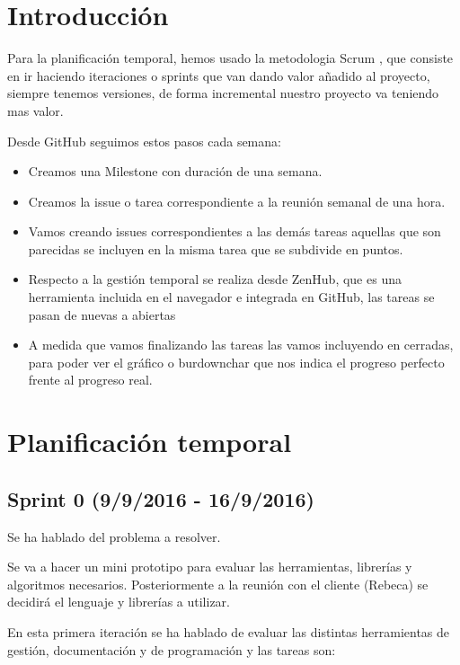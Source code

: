 
\section{Introducción}
Para la planificación temporal, hemos usado la metodologia Scrum \cite{Scrum}, que consiste en ir haciendo iteraciones o sprints que van dando valor añadido al proyecto, siempre tenemos versiones, de forma incremental nuestro proyecto va teniendo mas valor.

Desde GitHub seguimos estos pasos cada semana:
\begin{itemize}
\item Creamos una Milestone con duración de una semana.
\item Creamos la issue o tarea correspondiente a la reunión semanal de una hora.
\item Vamos creando issues correspondientes a las demás tareas aquellas que son parecidas se incluyen en la misma tarea que se subdivide en puntos.
\item Respecto a la gestión temporal se realiza desde ZenHub, que es una herramienta incluida en el navegador e integrada en GitHub, las tareas se pasan de nuevas a abiertas
\item A medida que vamos finalizando las tareas las vamos incluyendo en cerradas, para poder ver el gráfico o burdownchar que nos indica el progreso perfecto frente al progreso real.

\end{itemize}


\section{Planificación temporal}

\subsection{Sprint 0 (9/9/2016 - 16/9/2016)}
Se ha hablado del problema a resolver.

Se va a hacer un mini prototipo para evaluar las herramientas, librerías y algoritmos necesarios. Posteriormente a la reunión con el cliente (Rebeca) se decidirá el lenguaje y librerías a utilizar.

En esta primera iteración se ha hablado de evaluar las distintas herramientas de gestión, documentación y de programación y las tareas son:


